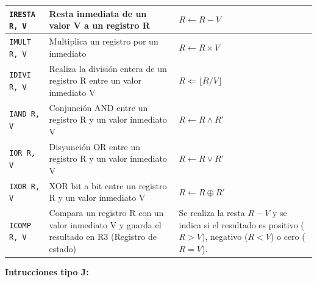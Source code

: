 \documentclass{article}
\begin{document}
\begin{longtable}{|p{}|p{}|p{}|}
  \hline
  \texttt{IRESTA R, V}        & Resta inmediata de un valor V a un registro R                                                             & $R \leftarrow R - V$                                                                                                \\
  \hline
  \texttt{IMULT R, V}         & Multiplica un registro por un inmediato                                                                   & $R \leftarrow R \times V$                                                                                           \\
  \hline
  \texttt{IDIVI R, V}         & Realiza la división entera de un registro R entre un valor inmediato V                                    & $R \Leftarrow \lfloor R / V \rfloor $                                                                               \\
  \hline
  \texttt{IAND R, V}          & Conjunción AND entre un registro R y un valor inmediato V                                                 & $ R \leftarrow R \wedge R'$                                                                                         \\
  \hline
  \texttt{IOR R, V}           & Disyunción OR entre un registro R y un valor inmediato V                                                  & $R \leftarrow R \vee R'$                                                                                            \\
  \hline
  \texttt{IXOR R, V}          & XOR bit a bit entre un registro R y un valor inmediato V                                                  & $R \leftarrow R \oplus R'$                                                                                          \\
  \hline
  \texttt{ICOMP R, V}         & Compara un registro R con un valor inmediato V y guarda el resultado en R3 (Registro de estado)           & Se realiza la resta $R - V$ y se indica si el resultado es positivo ($R > V$), negativo ($R < V$) o cero ($R = V$). \\
  \hline
\end{longtable}

\textbf{Intrucciones tipo J:}
\end{document}
